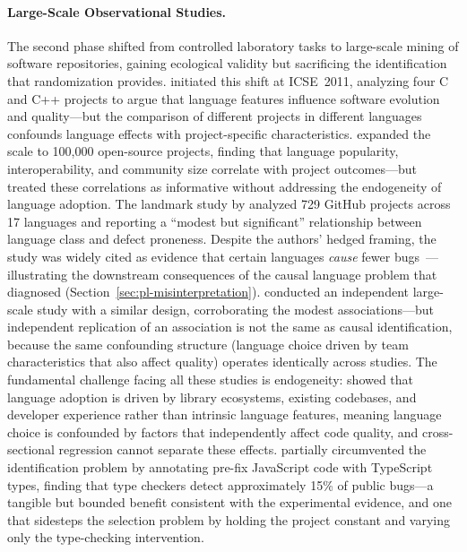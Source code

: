 \paragraph{Large-Scale Observational Studies.}
The second phase shifted from controlled laboratory tasks to large-scale mining of software repositories, gaining ecological validity but sacrificing the identification that randomization provides.
\citet{DBLP:conf/icse/BhattacharyaN11} initiated this shift at ICSE~2011, analyzing four C and C++ projects to argue that language features influence software evolution and quality---but the comparison of different projects in different languages confounds language effects with project-specific characteristics.
\citet{DBLP:conf/compsac/BissyandeTLJR13} expanded the scale to 100,000 open-source projects, finding that language popularity, interoperability, and community size correlate with project outcomes---but treated these correlations as informative without addressing the endogeneity of language adoption.
The landmark study by \citet{DBLP:conf/sigsoft/RayPFD14, DBLP:journals/cacm/RayPDF17} analyzed 729 GitHub projects across 17 languages and reporting a ``modest but significant'' relationship between language class and defect proneness.
Despite the authors' hedged framing, the study was widely cited as evidence that certain languages \emph{cause} fewer bugs~\cite{DBLP:journals/corr/abs-1911-11894}---illustrating the downstream consequences of the causal language problem that \citet{hernan2018cword} diagnosed (Section~\ref{sec:pl-misinterpretation}).
\citet{DBLP:conf/wcre/KochharWL16} conducted an independent large-scale study with a similar design, corroborating the modest associations---but independent replication of an association is not the same as causal identification, because the same confounding structure (language choice driven by team characteristics that also affect quality) operates identically across studies.
The fundamental challenge facing all these studies is endogeneity: \citet{DBLP:conf/oopsla/MeyerovichR13} showed that language adoption is driven by library ecosystems, existing codebases, and developer experience rather than intrinsic language features, meaning language choice is confounded by factors that independently affect code quality, and cross-sectional regression cannot separate these effects.
\citet{DBLP:conf/icse/GaoBB17} partially circumvented the identification problem by annotating pre-fix JavaScript code with TypeScript types, finding that type checkers detect approximately 15\% of public bugs---a tangible but bounded benefit consistent with the experimental evidence, and one that sidesteps the selection problem by holding the project constant and varying only the type-checking intervention.

